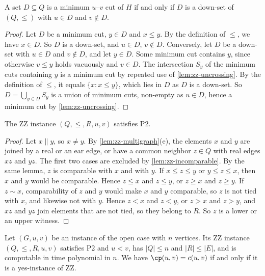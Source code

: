 \begin{lemma}
\label{lem:zz-down-sets}
A set $D \subseteq Q$ is a minimum $u$--$v$ cut of $H$ if and only if $D$ is a down-set of $(Q, \leq)$ with $u \in D$ and $v \notin D$.
\end{lemma}

\begin{proof}
Let $D$ be a minimum cut, $y \in D$ and $x \leq y$.
By the definition of $\leq$, we have $x \in D$.
So $D$ is a down-set, and $u \in D$, $v \notin D$.
Conversely, let $D$ be a down-set with $u \in D$ and $v \notin D$, and let $y \in D$.
Some minimum cut contains $y$, since otherwise $v \leq y$ holds vacuously and $v \in D$.
The intersection $S_y$ of the minimum cuts containing $y$ is a minimum cut by repeated use of \cref{lem:zz-uncrossing}.
By the definition of $\leq$, it equals $\{x : x \leq y\}$, which lies in $D$ as $D$ is a down-set.
So $D = \bigcup_{y \in D} S_y$ is a union of minimum cuts, non-empty as $u \in D$, hence a minimum cut by \cref{lem:zz-uncrossing}.
\end{proof}

\begin{lemma}[P2]
\label{lem:zz-p2}
The ZZ instance $(Q, \leq, R, u, v)$ satisfies P2.
\end{lemma}

\begin{proof}
Let $x \parallel y$, so $x \neq y$.
By \cref{lem:zz-multigraph}(e), the elements $x$ and $y$ are joined by a real or an ear edge, or have a common neighbor $z \in Q$ with real edges $xz$ and $yz$.
The first two cases are excluded by \cref{lem:zz-incomparable}.
By the same lemma, $z$ is comparable with $x$ and with $y$.
If $x \leq z \leq y$ or $y \leq z \leq x$, then $x$ and $y$ would be comparable.
Hence $z \leq x$ and $z \leq y$, or $z \geq x$ and $z \geq y$.
If $z \sim x$, comparability of $z$ and $y$ would make $x$ and $y$ comparable, so $z$ is not tied with $x$, and likewise not with $y$.
Hence $z < x$ and $z < y$, or $z > x$ and $z > y$, and $xz$ and $yz$ join elements that are not tied, so they belong to $R$.
So $z$ is a lower or an upper witness.
\end{proof}

\begin{theorem}[Reduction]
\label{thm:zz-reduction}
Let $(G, u, v)$ be an instance of the open case with $n$ vertices.
Its ZZ instance $(Q, \leq, R, u, v)$ satisfies P2 and $u < v$, has $|Q| \leq n$ and $|R| \leq |E|$, and is computable in time polynomial in $n$.
We have $\cp(u, v) = c(u, v)$ if and only if it is a yes-instance of ZZ.
\end{theorem}

